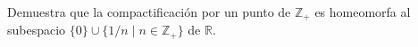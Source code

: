  \item Demuestra que la compactificación por un punto de $\mathbb{Z}_{+}$ es homeomorfa al subespacio $\{0\} \cup \{1 / n \mid n \in \mathbb{Z}_{+}\}$ de $\mathbb{R}$.